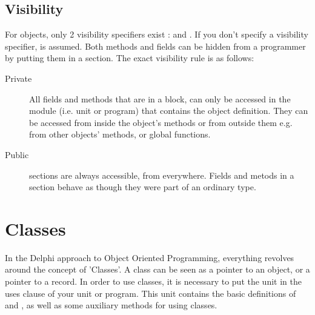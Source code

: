 \documentclass{report}
\begin{document}
\section{Visibility}
For objects, only 2 visibility specifiers exist :  and
. If you don't specify a visibility specifier, 
is assumed.
Both methods and fields can be hidden from a programmer by putting them
in a  section. The exact visibility rule is as follows:
\begin{description}
\item [Private\ ] All fields and methods that are in a  block,
can  only be accessed in the module (i.e. unit or program) that contains
the object definition.
They can be accessed from inside the object's methods or from outside them
e.g. from other objects' methods, or global functions.
\item [Public\ ] sections are always accessible, from everywhere.
Fields and metods in a  section behave as though they were part
of an ordinary  type.
\end{description}
\chapter{Classes}
In the Delphi approach to Object Oriented Programming, everything revolves
around  the concept of 'Classes'.  A class can be seen as a pointer to an
object, or a pointer to a record.
In order to use classes, it is necessary to put the  unit in the
uses clause of your unit or program. This unit contains the basic
definitions of  and , as well as some auxiliary
methods for using classes.
\end{document}
